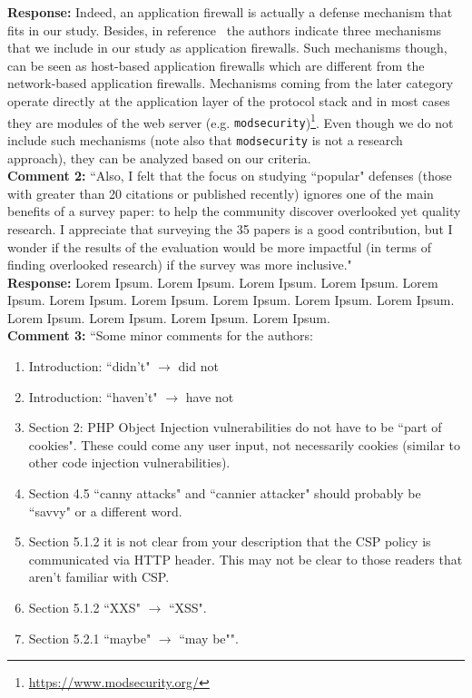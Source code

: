 \documentclass[10pt,journal,compsoc]{IEEEtran}
\begin{document}
\noindent
{\bf Response:}
Indeed,
an application firewall is actually a defense
mechanism that fits in our study.
Besides,
in reference~\cite{DPJV06}
the authors indicate three mechanisms~\cite{BK04,PB05,HO05b}
that we include in our study as
application firewalls.
Such mechanisms though,
can be seen as host-based application firewalls
which are different from the network-based
application firewalls.
Mechanisms coming from the later category
operate directly at the application
layer of the protocol stack and
in most cases they are modules
of the web server
(e.g. {\tt modsecurity})\footnote{\url{https://www.modsecurity.org/}}.
Even though we do not include such mechanisms
(note also that {\tt modsecurity} is
not a research approach),
they can be analyzed based on our criteria.\\

\noindent
{\bf Comment 2:} ``Also, I felt that the focus on
studying ``popular" defenses (those with
greater than 20 citations or published recently) ignores one of the	
main benefits of a survey paper: to help the community discover
overlooked yet quality research. I appreciate that surveying the 35
papers is a good contribution, but I wonder if the results of the
evaluation would be more impactful (in terms of finding overlooked
research) if the survey was more inclusive."\\

\noindent
{\bf Response:}
Lorem Ipsum. Lorem Ipsum. Lorem Ipsum. Lorem Ipsum. Lorem Ipsum. Lorem Ipsum. Lorem Ipsum. Lorem Ipsum. Lorem Ipsum. Lorem Ipsum. Lorem Ipsum. Lorem Ipsum. Lorem Ipsum. Lorem Ipsum.\\

\noindent
{\bf Comment 3:} ``Some minor comments for the authors:
\begin{enumerate}
\item Introduction: ``didn't" $\rightarrow$ did not
\item Introduction: ``haven't" $\rightarrow$ have not
\item Section 2: PHP Object Injection vulnerabilities do not have to be
 ``part of cookies". These could come any user input, not necessarily
 cookies (similar to other code injection vulnerabilities).
\item Section 4.5 ``canny attacks" and ``cannier attacker" should probably
 be ``savvy" or a different word.
\item Section 5.1.2 it is not clear from your description that the CSP
 policy is communicated via HTTP header. This may not be clear to
 those readers that aren't familiar with CSP.
\item Section 5.1.2 ``XXS" $\rightarrow$ ``XSS".
\item Section 5.2.1 ``maybe" $\rightarrow$ ``may be"".
\end{enumerate}
\end{document}
